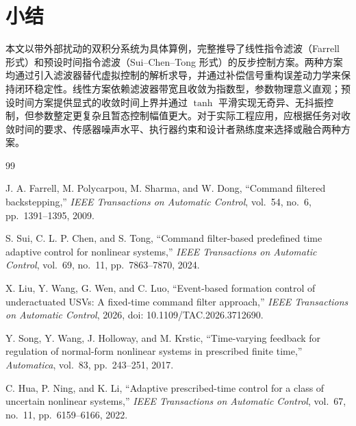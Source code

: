 \documentclass[UTF8,a4paper,11pt]{ctexart}
\begin{document}
\section{小结}

本文以带外部扰动的双积分系统为具体算例，完整推导了线性指令滤波（Farrell 形式）和预设时间指令滤波（Sui--Chen--Tong 形式）的反步控制方案。两种方案均通过引入滤波器替代虚拟控制的解析求导，并通过补偿信号重构误差动力学来保持闭环稳定性。线性方案依赖滤波器带宽且收敛为指数型，参数物理意义直观；预设时间方案提供显式的收敛时间上界并通过 $\tanh$ 平滑实现无奇异、无抖振控制，但参数整定更复杂且暂态控制幅值更大。对于实际工程应用，应根据任务对收敛时间的要求、传感器噪声水平、执行器约束和设计者熟练度来选择或融合两种方案。

\begin{thebibliography}{99}

J. A. Farrell, M. Polycarpou, M. Sharma, and W. Dong,
``Command filtered backstepping,''
\emph{IEEE Transactions on Automatic Control}, vol.~54, no.~6, pp.~1391--1395, 2009.

S. Sui, C. L. P. Chen, and S. Tong,
``Command filter-based predefined time adaptive control for nonlinear systems,''
\emph{IEEE Transactions on Automatic Control}, vol.~69, no.~11, pp.~7863--7870, 2024.

X. Liu, Y. Wang, G. Wen, and C. Luo,
``Event-based formation control of underactuated USVs: A fixed-time command filter approach,''
\emph{IEEE Transactions on Automatic Control}, 2026, doi: 10.1109/TAC.2026.3712690.

Y. Song, Y. Wang, J. Holloway, and M. Krstic,
``Time-varying feedback for regulation of normal-form nonlinear systems in prescribed finite time,''
\emph{Automatica}, vol.~83, pp.~243--251, 2017.

C. Hua, P. Ning, and K. Li,
``Adaptive prescribed-time control for a class of uncertain nonlinear systems,''
\emph{IEEE Transactions on Automatic Control}, vol.~67, no.~11, pp.~6159--6166, 2022.

\end{thebibliography}
\end{document}
